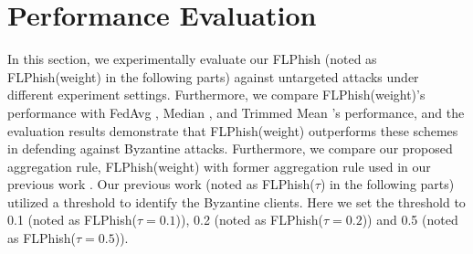\documentclass[journal]{IEEEtran}
\begin{document}
\section{Performance Evaluation}
In this section, we experimentally evaluate our FLPhish (noted as FLPhish(weight) in the following parts) against untargeted attacks under different experiment settings. Furthermore, we compare FLPhish(weight)'s performance with FedAvg \cite{ref_01_GoogleFL}, Median \cite{ref_13_defense}, and Trimmed Mean \cite{ref_13_defense}'s performance, and the evaluation results demonstrate that FLPhish(weight) outperforms these schemes in defending against Byzantine attacks. Furthermore, we compare our proposed aggregation rule, FLPhish(weight) with former aggregation rule used in our previous work \cite{li2021flphish}. Our previous work (noted as FLPhish($\tau$) in the following parts) utilized a threshold to identify the Byzantine clients. Here we set the threshold to 0.1 (noted as FLPhish($\tau=0.1$)), 0.2 (noted as FLPhish($\tau=0.2$)) and 0.5 (noted as FLPhish($\tau=0.5$)).

\begin{table}[t]
  \renewcommand\arraystretch{1.5}
  \centering
  \caption{Evaluated Scheme}
  \end{table}
\end{document}
